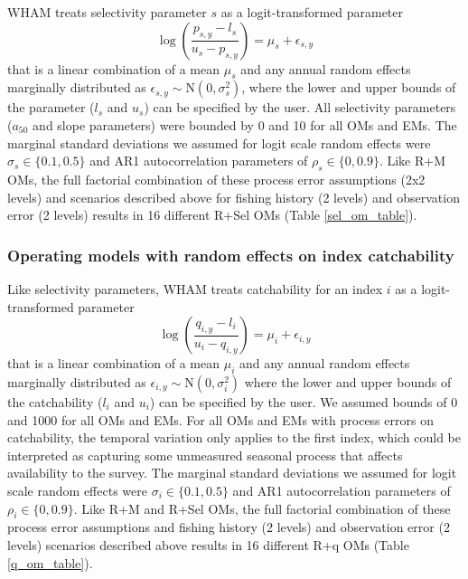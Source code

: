 \documentclass[
  12pt,
]{article}
\begin{document}
WHAM treats selectivity parameter \(s\) as a logit-transformed parameter
\[
\log\left(\frac{p_{s,y}-l_{s}}{u_{s}-p_{s,y}}\right) = \mu_s + \epsilon_{s,y}
\] that is a linear combination of a mean \(\mu_s\) and any annual
random effects marginally distributed as
\(\epsilon_{s,y} \sim \text{N}\left(0,\sigma_s^2\right)\), where the
lower and upper bounds of the parameter (\(l_s\) and \(u_s\)) can be
specified by the user. All selectivity parameters (\(a_{50}\) and slope
parameters) were bounded by 0 and 10 for all OMs and EMs. The marginal
standard deviations we assumed for logit scale random effects were
\(\sigma_s \in \{0.1, 0.5\}\) and AR1 autocorrelation parameters of
\(\rho_s \in \{0,0.9\}\). Like R+M OMs, the full factorial combination
of these process error assumptions (2x2 levels) and scenarios described
above for fishing history (2 levels) and observation error (2 levels)
results in 16 different R+Sel OMs (Table \ref{sel_om_table}).

\subsubsection*{Operating models with random effects on index
catchability}\label{operating-models-with-random-effects-on-index-catchability}

Like selectivity parameters, WHAM treats catchability for an index \(i\)
as a logit-transformed parameter \[
\log\left(\frac{q_{i,y}-l_{i}}{u_{i}-q_{i,y}}\right) = \mu_i + \epsilon_{i,y}
\] that is a linear combination of a mean \(\mu_i\) and any annual
random effects marginally distributed as
\(\epsilon_{i,y} \sim \text{N}\left(0,\sigma_i^2\right)\) where the
lower and upper bounds of the catchability (\(l_i\) and \(u_i\)) can be
specified by the user. We assumed bounds of 0 and 1000 for all OMs and
EMs. For all OMs and EMs with process errors on catchability, the
temporal variation only applies to the first index, which could be
interpreted as capturing some unmeasured seasonal process that affects
availability to the survey. The marginal standard deviations we assumed
for logit scale random effects were \(\sigma_i \in \{0.1, 0.5\}\) and
AR1 autocorrelation parameters of \(\rho_i \in \{0,0.9\}\). Like R+M and
R+Sel OMs, the full factorial combination of these process error
assumptions and fishing history (2 levels) and observation error (2
levels) scenarios described above results in 16 different R+q OMs (Table
\ref{q_om_table}).
\end{document}
